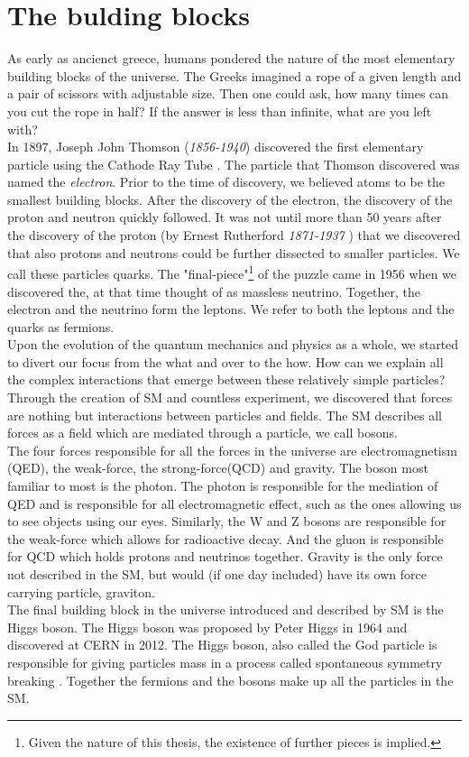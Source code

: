 \section{The bulding blocks}
As early as ancienct greece, humans pondered the nature of the most elementary building blocks of
the universe. The Greeks imagined a rope of a given length and a pair of scissors with adjustable size.
Then one could ask, how many times can you cut the rope in half? If the answer is less than infinite,
what are you left with?
\\
In 1897, Joseph John Thomson (\emph{1856-1940}) discovered the first elementary particle using the Cathode Ray Tube \cite{JJ}. 
The particle that Thomson discovered was named the \emph{electron}. Prior to the time of discovery, we believed atoms to 
be the smallest building blocks. After the discovery of the electron, the discovery of the 
proton and neutron quickly followed. It was not until more than 50 years after the discovery of 
the proton (by Ernest Rutherford \emph{1871-1937} \cite{Rutherfoord}) that we discovered that also protons and neutrons could be further
dissected to smaller particles. We call these particles quarks. The "final-piece"\footnote{Given the
nature of this thesis, the existence of further pieces is implied.} of the puzzle came
in 1956 \cite{Reines} when we discovered the, at that time thought of as massless neutrino. Together, the 
electron and the neutrino form the leptons. We refer to both the leptons and the quarks as fermions.
\\
Upon the evolution of the quantum mechanics and physics as a whole, we started to divert
our focus from the what and over to the how. How can we explain all the complex interactions
that emerge between these relatively simple particles? Through the creation of \ac{SM} and countless 
experiment, we discovered that forces are nothing but interactions between particles and fields.
The \ac{SM} describes all forces as a field which are mediated through a particle, we call bosons. 
\\
The four forces responsible for all the forces in the universe are electromagnetism (\ac{QED}), the weak-force, 
the strong-force(\ac{QCD}) and gravity. The boson most familiar to most is the photon. The photon is responsible 
for the mediation of \ac{QED} and is responsible for all electromagnetic effect, such as the ones allowing
us to see objects using our eyes. Similarly, the W and Z bosons are responsible for the weak-force which
allows for radioactive decay. And the gluon is responsible for \ac{QCD} which holds protons and 
neutrinos together. Gravity is the only force not described in the SM, but would (if one day included)
have its own force carrying particle, graviton. 
\\
The final building block in the universe introduced and described by \ac{SM} is the Higgs boson.
The Higgs boson was proposed by Peter Higgs in 1964 and discovered at CERN in 2012. The Higgs boson,
also called the God particle is responsible for giving particles mass in a process called
spontaneous symmetry breaking \cite{SSB}. Together the fermions and the bosons make up all the 
particles in the \ac{SM}.
